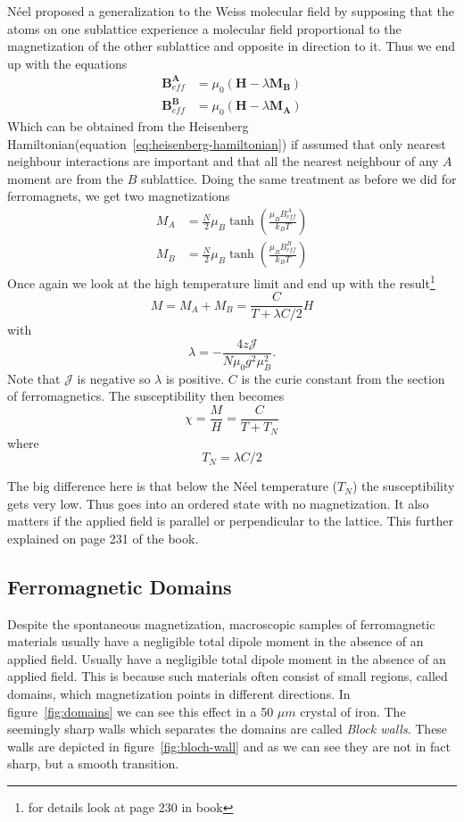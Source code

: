 \documentclass[11pt]{article}
\begin{document}
Néel proposed a generalization to the Weiss molecular field  by supposing that the atoms on one sublattice experience a molecular field proportional to the magnetization of the other sublattice and opposite in direction to it. Thus we end up with the equations
\begin{align}
	\pmb{B}^{\pmb{A}}_{eff} &= \mu_0 (\pmb{H} - \lambda \pmb{M}_{\pmb{B}}) \\
	\pmb{B}^{\pmb{B}}_{eff} &= \mu_0 (\pmb{H} - \lambda \pmb{M}_{\pmb{A}})
\end{align}
Which can be obtained from the Heisenberg Hamiltonian(equation~\ref{eq:heisenberg-hamiltonian}) if assumed that only nearest neighbour interactions are important and that all the nearest neighbour of any $A$ moment are from the $B$ sublattice. Doing the same treatment as before we did for ferromagnets, we get two magnetizations
\begin{align}
	M_A &= \frac{N}{2} \mu_B \tanh{(\frac{\mu_B B^A_{eff}}{k_B T})} \\
	M_B &= \frac{N}{2} \mu_B \tanh{(\frac{\mu_B B^B_{eff}}{k_B T})}
\end{align}
Once again we look at the high temperature limit and end up with the result\footnote{for details look at page 230 in book}
\begin{equation}
	M = M_A + M_B = \frac{C}{T + \lambda C/2} H
\end{equation}
with 
\begin{equation}
	\lambda = - \frac{4z \mathscr{J}}{N \mu_0 g^2 \mu^2_B}.
\end{equation}
Note that $\mathscr{J}$ is negative so $\lambda$ is positive. $C$ is the curie constant from the section of ferromagnetics. The susceptibility then becomes
\begin{equation}
	\chi = \frac{M}{H} = \frac{C}{T+ T_N}
\end{equation}
where 
\begin{equation}
	T_N = \lambda C/2
\end{equation}

The big difference here is that below the Néel temperature ($T_N$) the susceptibility gets very low. Thus goes into an ordered state with no magnetization. It also matters if the applied field is parallel or perpendicular to the lattice. This further explained on page 231 of the book.

\newpage
\subsection{Ferromagnetic Domains}
Despite the spontaneous magnetization, macroscopic samples of ferromagnetic materials usually have a negligible total dipole moment in the absence of an applied field. Usually have a negligible total dipole moment in the absence of an applied field. This is because such materials often consist of small regions, called domains, which magnetization points in different directions. In figure~\ref{fig:domains} we can see this effect in a 50 $\mu m$ crystal of iron. The seemingly sharp walls which separates the domains are called \emph{Block walls}. These walls are depicted in figure~\ref{fig:bloch-wall} and as we can see they are not in fact sharp, but a smooth transition.
\end{document}
